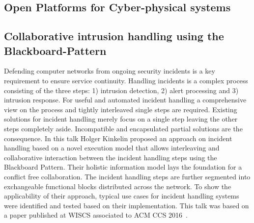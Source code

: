 
\subsection{Open Platforms for Cyber-physical systems}


\subsection{Collaborative intrusion handling using the Blackboard-Pattern}

Defending computer networks from ongoing security incidents is a key requirement to ensure service continuity. Handling incidents is a complex process consisting of the three steps: 1) intrusion detection, 2) alert processing and 3) intrusion response. For useful and automated incident handling a comprehensive view on the process and tightly interleaved single steps are required. Existing solutions for incident handling merely focus on a single step leaving the other steps completely aside. Incompatible and encapsulated partial solutions are the consequence. In this talk Holger Kinkelin proposed an approach on incident handling based on a novel execution model that allows interleaving and collaborative interaction between the incident handling steps using the Blackboard Pattern. Their holistic information model lays the foundation for a conflict free collaboration. The incident handling steps are further segmented into exchangeable functional blocks distributed across the network. To show the applicability of their approach, typical use cases for incident handling systems were identified and tested based on their implementation. This talk was based on a paper published at WISCS associated to ACM CCS 2016~\cite{Herold2016}.


